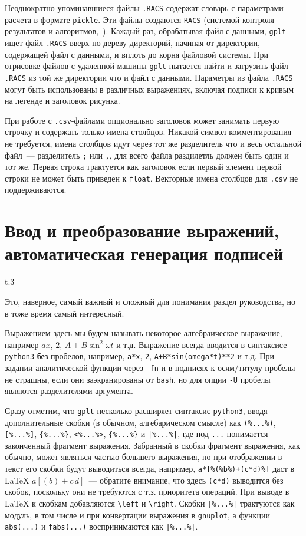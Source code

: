 \documentclass[12pt]{article}
\def\gplt{{\tt gplt}}
\def\gnuplot{{\tt gnuplot}}
\def\python{{\tt python3}}
\begin{document}
Неоднократно упоминавшиеся файлы \verb'.RACS' содержат словарь с параметрами расчета в формате \verb'pickle'.
Эти файлы создаются \verb'RACS' (системой контроля результатов и алгоритмов,~\cite{aiwlib:SR:PP2018}).
Каждый раз, обрабатывая файл с данными, \gplt{} ищет файл \verb'.RACS' вверх по дереву директорий, начиная от директории, содержащей файл с данными,
и вплоть до корня файловой системы. При отрисовке файлов с удаленной машины \gplt{} пытается найти и загрузить файл \verb'.RACS' из той же директории что и 
файл с данными. Параметры из файла \verb'.RACS' могут быть использованы в различных выражениях, включая подписи к кривым на легенде и
заголовок рисунка.

При работе с \verb'.csv'-файлами опционально заголовок может занимать первую строчку и содержать только имена столбцов. Никакой символ комментирования не требуется,
имена столбцов идут через тот же разделитель что и весь остальной файл~--- разделитель \verb';' или \verb',', для всего файла раздилетль должен быть один и тот же.
Первая строка трактуется как заголовок если первый элемент первой строки не может быть приведен к \verb'float'.
Векторные имена столбцов для \verb'.csv' не поддерживаются.

\section{Ввод и преобразование выражений, автоматическая генерация подписей}
\begin{wrapfigure}[8]{t}{.3\textwidth}
  \vphantom{.}
  \vspace{-1cm}

\end{wrapfigure}
Это, наверное, самый важный и сложный для понимания раздел руководства, но в тоже время самый интересный. 

Выражением здесь мы будем называть некоторое алгебраическое выражение, например $a x$, $2$, $A + B\sin^2\omega t$ и т.д. Выражение всегда вводится
в синтаксисе \python{} {\bf без} пробелов, например, \verb'a*x', \verb'2', \verb'A+B*sin(omega*t)**2' и т.д.
При задании аналитической функции через {\tt -fn} и в подписях к осям/титулу пробелы не страшны, если они
  заэкранированы от {\tt bash}, но для опции {\tt -U} пробелы являются разделителями аргумента. 

  Сразу отметим, что \gplt{} несколько расширяет синтаксис \python{}, вводя дополнительные скобки (в обычном, алгебарическом смысле) как
\verb'(%...%)', \verb'[%...%]', \verb'{%...%}', \verb'<%...%>', \verb'{%...%}' и \verb'|%...%|', где под \verb'...' понимается законченный фрагмент выражения.
Забранный в скобки фрагмент выражения, как обычно, может являться частью большего выражения, но при отображении в текст его скобки будут выводиться всегда, например,
\verb'a*[%(%b%)+(c*d)%]' даст в \LaTeX{}
$a[(b)+c\,d]$~--- обратите внимание, что здесь \verb'(c*d)' выводится без скобок, поскольку они не требуются
с т.з. приоритета операций. При выводе в \LaTeX{} к скобкам добавляются \verb'\left' и \verb'\right'. Скобки \verb'|%...%|' трактуются как модуль,
в том числе и при конвертации выражения в \gnuplot{}, а функции \verb'abs(...)' и \verb'fabs(...)' воспринимаются как \verb'|%...%|'.
\end{document}
